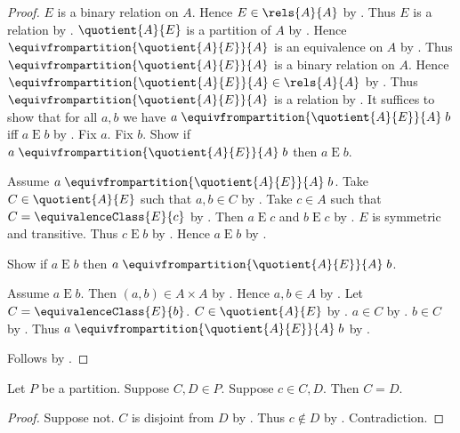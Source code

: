 \begin{proof}
    $E$ is a binary relation on $A$.
    Hence $E\in\rels{A}{A}$ by .
    Thus $E$ is a relation by .
    $\quotient{A}{E}$ is a partition of $A$
        by .
    Hence $\equivfrompartition{\quotient{A}{E}}{A}$ is an equivalence on $A$
        by .
    Thus $\equivfrompartition{\quotient{A}{E}}{A}$ is a binary relation on $A$.
    Hence $\equivfrompartition{\quotient{A}{E}}{A}\in\rels{A}{A}$
        by .
    Thus $\equivfrompartition{\quotient{A}{E}}{A}$ is a relation
        by .
    It suffices to show that for all $a,b$ we have
        $a\mathrel{\equivfrompartition{\quotient{A}{E}}{A}}b$ iff
        $a\mathrel{E}b$
        by .
    Fix $a$.
    Fix $b$.
    Show if $a\mathrel{\equivfrompartition{\quotient{A}{E}}{A}}b$ then
        $a\mathrel{E}b$.
    \begin{subproof}
        Assume $a\mathrel{\equivfrompartition{\quotient{A}{E}}{A}}b$.
        Take $C\in\quotient{A}{E}$ such that $a,b\in C$
            by .
        Take $c\in A$ such that $C=\equivalenceClass{E}{c}$
            by .
        Then $a\mathrel{E}c$ and $b\mathrel{E}c$
            by .
        $E$ is symmetric and transitive.
        Thus $c\mathrel{E}b$ by .
        Hence $a\mathrel{E}b$ by .
    \end{subproof}
    Show if $a\mathrel{E}b$ then
        $a\mathrel{\equivfrompartition{\quotient{A}{E}}{A}}b$.
    \begin{subproof}
        Assume $a\mathrel{E}b$.
        Then $(a,b)\in A\times A$ by .
        Hence $a,b\in A$ by .
        Let $C=\equivalenceClass{E}{b}$.
        $C\in\quotient{A}{E}$ by .
        $a\in C$ by .
        $b\in C$ by .
        Thus $a\mathrel{\equivfrompartition{\quotient{A}{E}}{A}}b$
            by .
    \end{subproof}
    Follows by \auto.
\end{proof}

\begin{lemma}\label{partition_blocks_meeting_eq}
    Let $P$ be a partition.
    Suppose $C,D\in P$.
    Suppose $c\in C,D$.
    Then $C=D$.
\end{lemma}
\begin{proof}
    Suppose not.
    $C$ is disjoint from $D$ by .
    Thus $c\notin D$ by .
    Contradiction.
\end{proof}

